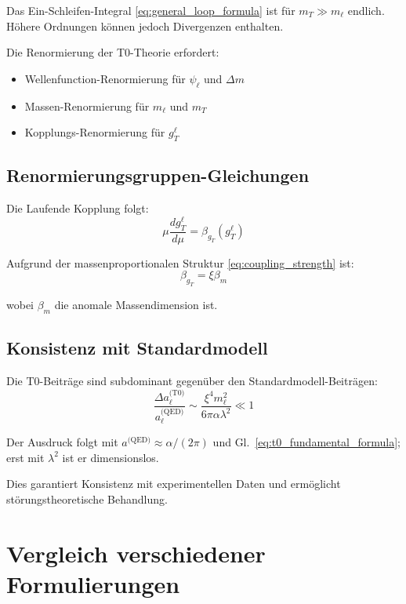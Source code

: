 	Das Ein-Schleifen-Integral \eqref{eq:general_loop_formula} ist für $m_T \gg m_\ell$ endlich. Höhere Ordnungen können jedoch Divergenzen enthalten.
	
	Die Renormierung der T0-Theorie erfordert:
	\begin{itemize}
		\item Wellenfunction-Renormierung für $\psi_\ell$ und $\Delta m$
		\item Massen-Renormierung für $m_\ell$ und $m_T$
		\item Kopplungs-Renormierung für $g_T^\ell$
	\end{itemize}
	
	\subsection{Renormierungsgruppen-Gleichungen}
	
	Die Laufende Kopplung folgt:
	\begin{equation}
		\mu \frac{d g_T^\ell}{d\mu} = \beta_{g_T}(g_T^\ell)
		\label{eq:rg_equation}
	\end{equation}
	
	Aufgrund der massenproportionalen Struktur \eqref{eq:coupling_strength} ist:
	\begin{equation}
		\beta_{g_T} = \xi \beta_m
		\label{eq:beta_relation}
	\end{equation}
	
	wobei $\beta_m$ die anomale Massendimension ist.
	
	\subsection{Konsistenz mit Standardmodell}
	
	Die T0-Beiträge sind subdominant gegenüber den Standardmodell-Beiträgen:
	\begin{equation}
		\frac{\Delta a_\ell^{\text{(T0)}}}{a_\ell^{\text{(QED)}}} \sim \frac{\xi^4 m_\ell^2}{6\pi\alpha\lambda^2} \ll 1
		\label{eq:hierarchy}
	\end{equation}
	
	Der Ausdruck folgt mit $a^\text{(QED)} \approx \alpha/(2\pi)$ und Gl.~\eqref{eq:t0_fundamental_formula}; erst mit $\lambda^2$ ist er dimensionslos.

	Dies garantiert Konsistenz mit experimentellen Daten und ermöglicht störungstheoretische Behandlung.
	
	\section{Vergleich verschiedener Formulierungen}
	
